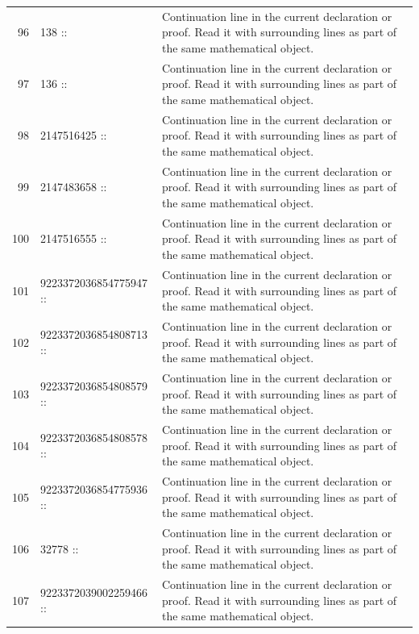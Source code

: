 \documentclass[10pt]{article}
\begin{document}
\begin{longtable}{r L{0.53\textwidth} L{0.37\textwidth}}
96 & {\ttfamily\scriptsize   138 ::} & Continuation line in the current declaration or proof.  Read it with surrounding lines as part of the same mathematical object. \\
97 & {\ttfamily\scriptsize   136 ::} & Continuation line in the current declaration or proof.  Read it with surrounding lines as part of the same mathematical object. \\
98 & {\ttfamily\scriptsize   2147516425 ::} & Continuation line in the current declaration or proof.  Read it with surrounding lines as part of the same mathematical object. \\
99 & {\ttfamily\scriptsize   2147483658 ::} & Continuation line in the current declaration or proof.  Read it with surrounding lines as part of the same mathematical object. \\
100 & {\ttfamily\scriptsize   2147516555 ::} & Continuation line in the current declaration or proof.  Read it with surrounding lines as part of the same mathematical object. \\
101 & {\ttfamily\scriptsize   9223372036854775947 ::} & Continuation line in the current declaration or proof.  Read it with surrounding lines as part of the same mathematical object. \\
102 & {\ttfamily\scriptsize   9223372036854808713 ::} & Continuation line in the current declaration or proof.  Read it with surrounding lines as part of the same mathematical object. \\
103 & {\ttfamily\scriptsize   9223372036854808579 ::} & Continuation line in the current declaration or proof.  Read it with surrounding lines as part of the same mathematical object. \\
104 & {\ttfamily\scriptsize   9223372036854808578 ::} & Continuation line in the current declaration or proof.  Read it with surrounding lines as part of the same mathematical object. \\
105 & {\ttfamily\scriptsize   9223372036854775936 ::} & Continuation line in the current declaration or proof.  Read it with surrounding lines as part of the same mathematical object. \\
106 & {\ttfamily\scriptsize   32778 ::} & Continuation line in the current declaration or proof.  Read it with surrounding lines as part of the same mathematical object. \\
107 & {\ttfamily\scriptsize   9223372039002259466 ::} & Continuation line in the current declaration or proof.  Read it with surrounding lines as part of the same mathematical object. \\

\end{longtable}
\end{document}
